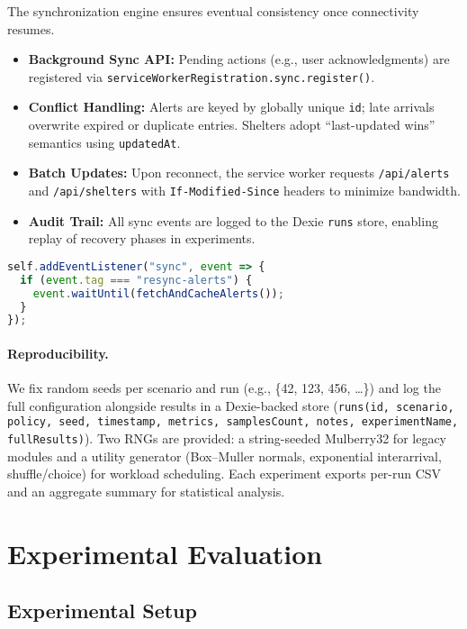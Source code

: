 \documentclass[11pt,twocolumn]{article}
\begin{document}
The synchronization engine ensures eventual consistency once connectivity resumes.

\begin{itemize}
    \item \textbf{Background Sync API:} Pending actions (e.g., user acknowledgments) are registered via \texttt{serviceWorkerRegistration.sync.register()}.
    \item \textbf{Conflict Handling:} Alerts are keyed by globally unique \texttt{id}; late arrivals overwrite expired or duplicate entries. Shelters adopt ``last-updated wins'' semantics using \texttt{updatedAt}.
    \item \textbf{Batch Updates:} Upon reconnect, the service worker requests \texttt{/api/alerts} and \texttt{/api/shelters} with \texttt{If-Modified-Since} headers to minimize bandwidth.
    \item \textbf{Audit Trail:} All sync events are logged to the Dexie \texttt{runs} store, enabling replay of recovery phases in experiments.
\end{itemize}

\begin{lstlisting}[language=JavaScript, caption={Background Sync Handler}]
self.addEventListener("sync", event => {
  if (event.tag === "resync-alerts") {
    event.waitUntil(fetchAndCacheAlerts());
  }
});
\end{lstlisting}

\paragraph{Reproducibility.}
We fix random seeds per scenario and run (e.g., \{42, 123, 456, \dots\}) and log the full configuration alongside results in a Dexie-backed store (\texttt{runs(id, scenario, policy, seed, timestamp, metrics, samplesCount, notes, experimentName, fullResults)}). Two RNGs are provided: a string-seeded Mulberry32 for legacy modules and a utility generator (Box--Muller normals, exponential interarrival, shuffle/choice) for workload scheduling. Each experiment exports per-run CSV and an aggregate summary for statistical analysis.

\section{Experimental Evaluation}

\subsection{Experimental Setup}
\end{document}
